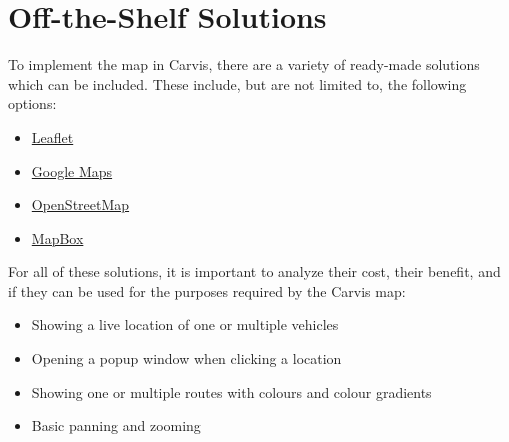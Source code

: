 \chapter{Off-the-Shelf Solutions}
To implement the map in Carvis, there are a variety of ready-made solutions which can be included.
These include, but are not limited to, the following options:
\begin{itemize}
    \item \href{https://leafletjs.com/}{Leaflet}
    \item \href{https://developers.google.com/maps/apis-by-platform}{Google Maps}
    \item \href{https://wiki.openstreetmap.org/wiki/API_v0.6}{OpenStreetMap}
    \item \href{https://www.mapbox.com/}{MapBox}
\end{itemize}

For all of these solutions, it is important to analyze their cost, their benefit, and if they can be used for the purposes required by the Carvis map:
\begin{itemize}
    \item Showing a live location of one or multiple vehicles
    \item Opening a popup window when clicking a location
    \item Showing one or multiple routes with colours and colour gradients
    \item Basic panning and zooming
\end{itemize}